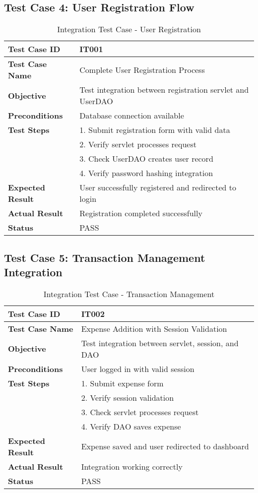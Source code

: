\subsection{Test Case 4: User Registration Flow}
\begin{table}[h]
\centering
\begin{tabular}{|p{3cm}|p{10cm}|}
\hline
\textbf{Test Case ID} & IT001 \\
\hline
\textbf{Test Case Name} & Complete User Registration Process \\
\hline
\textbf{Objective} & Test integration between registration servlet and UserDAO \\
\hline
\textbf{Preconditions} & Database connection available \\
\hline
\textbf{Test Steps} & 1. Submit registration form with valid data\\
& 2. Verify servlet processes request\\
& 3. Check UserDAO creates user record\\
& 4. Verify password hashing integration \\
\hline
\textbf{Expected Result} & User successfully registered and redirected to login \\
\hline
\textbf{Actual Result} & Registration completed successfully \\
\hline
\textbf{Status} & PASS \\
\hline
\end{tabular}
\caption{Integration Test Case - User Registration}
\end{table}

\subsection{Test Case 5: Transaction Management Integration}
\begin{table}[h]
\centering
\begin{tabular}{|p{3cm}|p{10cm}|}
\hline
\textbf{Test Case ID} & IT002 \\
\hline
\textbf{Test Case Name} & Expense Addition with Session Validation \\
\hline
\textbf{Objective} & Test integration between servlet, session, and DAO \\
\hline
\textbf{Preconditions} & User logged in with valid session \\
\hline
\textbf{Test Steps} & 1. Submit expense form\\
& 2. Verify session validation\\
& 3. Check servlet processes request\\
& 4. Verify DAO saves expense \\
\hline
\textbf{Expected Result} & Expense saved and user redirected to dashboard \\
\hline
\textbf{Actual Result} & Integration working correctly \\
\hline
\textbf{Status} & PASS \\
\hline
\end{tabular}
\caption{Integration Test Case - Transaction Management}
\end{table}

